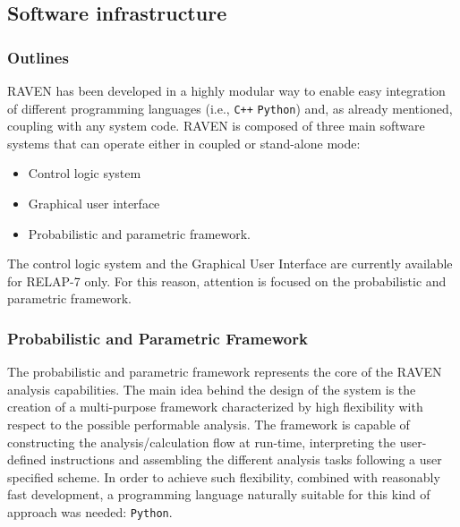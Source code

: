 \subsection{Software infrastructure}
\subsubsection{Outlines}
RAVEN has been developed in a highly modular way to enable easy integration of different programming languages (i.e., \texttt{C++} \texttt{Python}) and, as already mentioned, coupling with any system code.
RAVEN is composed of three main software systems that can operate either in coupled or stand-alone mode:
\begin{itemize}
  \item Control logic system
  \item Graphical user interface
  \item Probabilistic and parametric framework.
\end{itemize}
The control logic system and the Graphical User Interface are currently available for RELAP-7 only. For this reason, attention is focused on the probabilistic and parametric framework.

\subsubsection{Probabilistic and Parametric Framework}
The probabilistic and parametric framework represents the core of the RAVEN analysis capabilities. The main idea behind the design of the system is the creation of a multi-purpose framework characterized by high flexibility with respect to the possible performable analysis. The framework is capable of constructing the analysis/calculation flow at run-time, interpreting the user-defined instructions and assembling the different analysis tasks following a user specified scheme.
In order to achieve such flexibility, combined with reasonably fast development, a programming language naturally suitable for this kind of approach was needed: \texttt{Python}.

